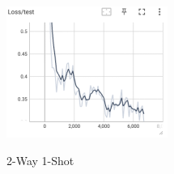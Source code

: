 \documentclass[12pt]{article}
\begin{document}
\begin{figure}[htbp]
\begin{minipage}{0.4\linewidth}
		\includegraphics[width=0.9\linewidth]{./figures/2w1s_test_loss.png}
		\label{pic three}%
	\end{minipage}
    \caption{2-Way 1-Shot}
    \label{2w1s}
    \end{figure}
\end{document}
